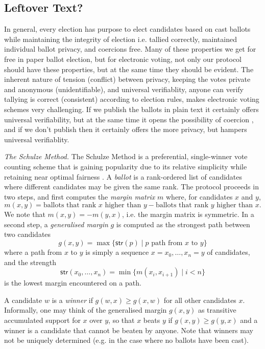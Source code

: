 \documentclass{llncs}
\newcommand{\str}{\mathsf{str}}
\begin{document}
\subsection*{Leftover Text?}
In general, every election has purpose to elect candidates based on cast
  ballots while maintaining the integrity of election i.e. tallied correctly, 
  maintained individual ballot privacy, and coercions free. Many of these properties 
  we get for free in paper ballot election, but for electronic voting, not only 
  our protocol should have these properties, but at the same time they should be 
  evident. The inherent nature of tension (conflict) between privacy, keeping the votes 
  private and anonymous (unidentifiable), and universal verifiablity, anyone can verify
  tallying is correct (consistent) according to election rules, makes electronic 
  voting schemes very challenging. If we publish 
  the ballots in plain text it certainly offers universal verifiability, but at the same
  time it opens the possibility of coercion \cite{Benaloh:2009:SSC}, and if we don't
  publish then it certainly offers the more privacy, but hampers universal 
  verifiablity. \linebreak
      
  \smallskip\noindent\emph{The Schulze Method.} The Schulze Method
  \cite{Schulze:2011:NMC} is a preferential, single-winner vote
  counting scheme that is gaining popularity due to its relative
  simplicity while retaining near optimal fairness
  \cite{Rivest:2010:OSW}.  
  A \emph{ballot} is a rank-ordered list of
  candidates where different candidates may be given the same rank.
  The protocol proceeds in two steps, and first computes the
  \emph{margin matrix} $m$ where, for candidates $x$ and $y$, 
  \[ m(x, y) = \mbox{ballots that rank $x$ higher than $y$} - \mbox{ballots
  that rank $y$ higher than $x$}. \]
  We note that $m(x, y) = -m(y, x)$, i.e. the margin matrix is
  symmetric. In a second step, a \emph{generalised margin} $g$ is
  computed as the strongest path between two candidates
  \[ g(x,y) = \max \lbrace \str(p) \mid p \mbox{ path from $x$ to
  $y$} \rbrace \]
  where a path from $x$ to $y$ is simply a sequence $x = x_0, \dots,
  x_n = y$ of candidates, and the strength
  \[ \str(x_0, \dots, x_n) = \min \lbrace m(x_i, x_{i+1}) \mid i < n
  \rbrace  \]
  is the lowest margin encountered on a path.

  A candidate $w$ is a \emph{winner} if $g(w, x) \geq g(x, w)$ for
  all other candidates $x$. Informally, one may think of the
  generalised margin $g(x, y)$ as transitive accumulated support for
  $x$ over $y$, so that $x$ beats $y$ if $g(x,y) \geq g(y, x)$ and a
  winner is a candidate that cannot be beaten by anyone. Note that
  winners may not be uniquely determined (e.g. in the case where no
  ballots have been cast).
\end{document}

